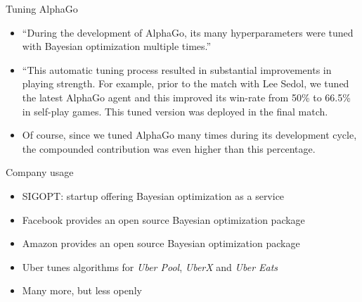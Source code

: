 \begin{frame}[c]{Tuning AlphaGo }
\begin{itemize}
    \item ``During the development of AlphaGo, \alert{its many hyperparameters were tuned with Bayesian optimization multiple times.}''
\medskip
    \item ``This automatic tuning process resulted in \alert{substantial improvements in playing strength}. For example, prior to the match with Lee Sedol, we tuned the latest AlphaGo agent and this \alert{improved its win-rate from 50\% to 66.5\%} in self-play games. \alert{This tuned version was deployed in the final match.}
\medskip
    \item Of course, since we tuned AlphaGo many times during its development cycle, the \alert{compounded contribution was even higher than this percentage.}
\end{itemize}

\end{frame}

\begin{frame}[c]{Company usage}
\begin{itemize}
    \item SIGOPT: startup offering Bayesian optimization as a service
    \item Facebook provides an open source Bayesian optimization package 
    \item Amazon provides an open source Bayesian optimization package 
    \item Uber tunes algorithms for \emph{Uber Pool}, \emph{UberX} and \emph{Uber Eats} 
    \item Many more, but less openly
\end{itemize}
\end{frame}

